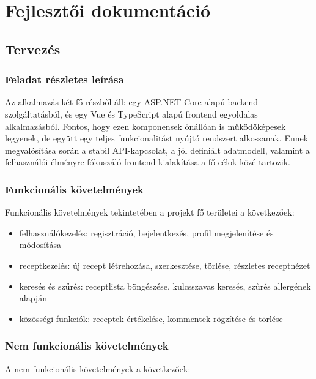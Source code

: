 ﻿\chapter{Fejlesztői dokumentáció}\label{ch:architecture}
\section{Tervezés}\label{sec:design}

\subsection{Feladat részletes leírása}

Az alkalmazás két fő részből áll: egy ASP.NET Core alapú backend szolgáltatásból, és egy Vue és TypeScript alapú frontend egyoldalas alkalmazásból. Fontos, hogy ezen komponensek önállóan is működőképesek legyenek, de együtt egy teljes funkcionalitást nyújtó rendszert alkossanak. Ennek megvalósítása során a stabil API-kapcsolat, a jól definiált adatmodell, valamint a felhasználói élményre fókuszáló frontend kialakítása a fő célok közé tartozik. 

\subsection{Funkcionális követelmények}\label{ch:requirements}

Funkcionális követelmények tekintetében a projekt fő területei a következőek:

\begin{itemize}
	\item felhasználókezelés: regisztráció, bejelentkezés, profil megjelenítése és módosítása
	\item receptkezelés: új recept létrehozása, szerkesztése, törlése, részletes receptnézet
	\item keresés és szűrés: receptlista böngészése, kulcsszavas keresés, szűrés allergének alapján
	\item közösségi funkciók: receptek értékelése, kommentek rögzítése és törlése
\end{itemize}

\subsection{Nem funkcionális követelmények}

A nem funkcionális követelmények a következőek:

